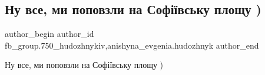  
 
 
 
 

\subsection{Ну все, ми поповзли на Софіївську площу )}
\label{sec:02_04_2018.fb.fb_group.750_hudozhnykiv.4.nu_vse_my_popovzly_na_sofiivsku_ploschu}
 
\ifcmt
 author_begin
   author_id fb_group.750_hudozhnykiv,anishyna_evgenia.hudozhnyk
 author_end
\fi

Ну все, ми поповзли на Софіївську площу )

